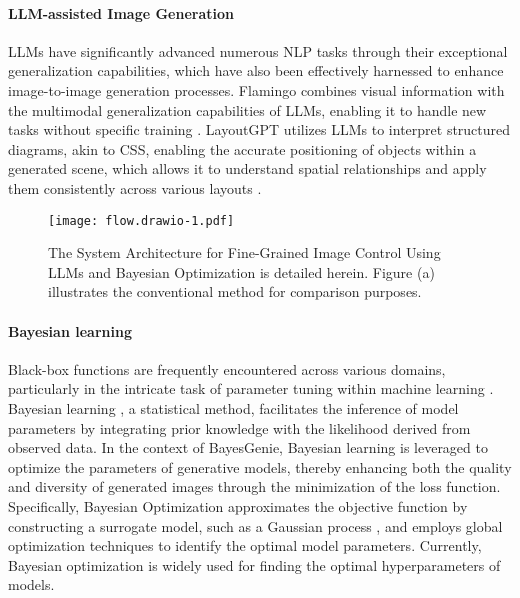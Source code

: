\paragraph{LLM-assisted Image Generation}
LLMs have significantly advanced numerous NLP tasks through their exceptional generalization capabilities, which have also been effectively harnessed to enhance image-to-image generation processes. Flamingo combines visual information with the multimodal generalization capabilities of LLMs, enabling it to handle new tasks without specific training \cite{alayrac2022flamingo}. LayoutGPT utilizes LLMs to interpret structured diagrams, akin to CSS, enabling the accurate positioning of objects within a generated scene, which allows it to understand spatial relationships and apply them consistently across various layouts \cite{NEURIPS2023_3a7f9e48}. 


\begin{figure*}[ht]
    \centering
    \texttt{[image: flow.drawio-1.pdf]}
    \caption{The System Architecture for Fine-Grained Image Control Using LLMs and Bayesian Optimization is detailed herein. Figure (a) illustrates the conventional method for comparison purposes.}
    \label{fig:flow}
\end{figure*}
 

\paragraph{Bayesian learning}
Black-box functions are frequently encountered across various domains, particularly in the intricate task of parameter tuning within machine learning \cite{JMLR:v25:23-0269}. Bayesian learning \cite{10.1115/1.3653121}, a statistical method, facilitates the inference of model parameters by integrating prior knowledge with the likelihood derived from observed data. In the context of BayesGenie, Bayesian learning is leveraged to optimize the parameters of generative models, thereby enhancing both the quality and diversity of generated images through the minimization of the loss function. Specifically, Bayesian Optimization approximates the objective function by constructing a surrogate model, such as a Gaussian process \cite{Jones1998}, and employs global optimization techniques to identify the optimal model parameters. Currently, Bayesian optimization is widely used for finding the optimal hyperparameters of models\cite{boyar2024latent,aristodemou2025maximizing}.